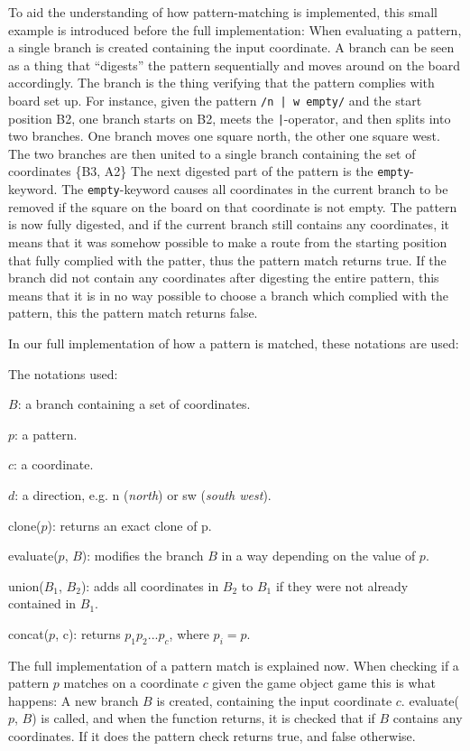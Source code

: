 To aid the understanding of how pattern-matching is implemented, this small example is introduced before the full implementation: 
When evaluating a pattern, a single branch is created containing the input coordinate. A branch can be seen as a thing that ``digests'' the pattern sequentially and moves around on the board accordingly. The branch is the thing verifying that the pattern complies with board set up. For instance, given the pattern \texttt{/n | w empty/} and the start position B2, one branch starts on B2, meets the \texttt{|}-operator, and then splits into two branches. One branch moves one square north, the other one square west. The two branches are then united to a single branch containing the set of coordinates \{B3, A2\} The next digested part of the pattern is the \texttt{empty}-keyword. The \texttt{empty}-keyword causes all coordinates in the current branch to be removed if the square on the board on that coordinate is not empty. The pattern is now fully digested, and if the current branch still contains any coordinates, it means that it was somehow possible to make a route from the starting position that fully complied with the patter, thus the pattern match returns true. If the branch did not contain any coordinates after digesting the entire pattern, this means that it is in no way possible to choose a branch which complied with the pattern, this the pattern match returns false.

In our full implementation of how a pattern is matched, these notations are used:

The notations used:
\begin{dlist}
\item $B$: a branch containing a set of coordinates.
\item $p$: a pattern.
\item $c$: a coordinate.
\item $d$: a direction, e.g. n (\textit{north}) or sw (\textit{south west}).
\item clone($p$): returns an exact clone of p.
\item evaluate($p$, $B$): modifies the branch $B$ in a way depending on the value of $p$.
\item union($B_1$, $B_2$): adds all coordinates in $B_2$ to $B_1$ if they were not already contained in $B_1$. 
\item concat($p$, c): returns $p_1 p_2 ... p_c$, where $p_i = p$.
\end{dlist}

The full implementation of a pattern match is explained now. When checking if a pattern $p$ matches on a coordinate $c$ given the game object $\text{game}$ this is what happens:
A new branch $B$ is created, containing the input coordinate $c$. 
evaluate($p$, $B$) is called, and when the function returns, it is checked that if $B$ contains any coordinates. If it does the pattern check returns true, and false otherwise.

